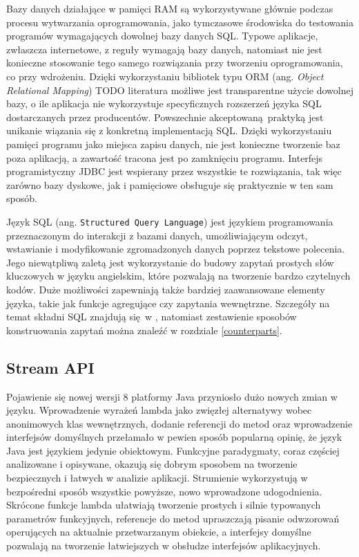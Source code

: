 \documentclass[12pt,twoside,openright]{extarticle}
\begin{document}
      Bazy danych działające w pamięci RAM są wykorzystywane głównie podczas procesu wytwarzania oprogramowania, jako tymczasowe środowiska do testowania programów wymagających dowolnej bazy danych SQL. Typowe aplikacje, zwłaszcza internetowe, z reguły wymagają bazy danych, natomiast nie jest konieczne stosowanie tego samego rozwiązania przy tworzeniu oprogramowania, co przy wdrożeniu. Dzięki wykorzystaniu bibliotek typu ORM (ang. \textit{Object Relational Mapping}) TODO literatura możliwe jest transparentne użycie dowolnej bazy, o ile aplikacja nie wykorzystuje specyficznych rozszerzeń języka SQL dostarczanych przez producentów. Powszechnie akceptowaną praktyką jest unikanie wiązania się z konkretną implementacją SQL. Dzięki wykorzystaniu pamięci programu jako miejsca zapisu danych, nie jest konieczne tworzenie baz poza aplikacją, a zawartość tracona jest po zamknięciu programu. Interfejs programistyczny JDBC jest wspierany przez wszystkie te rozwiązania, tak więc zarówno bazy dyskowe, jak i pamięciowe obsługuje się praktycznie w ten sam sposób. 

      Język SQL (ang. \texttt{Structured Query Language}) jest językiem programowania przeznaczonym do interakcji z bazami danych, umożliwiającym odczyt, wstawianie i modyfikowanie zgromadzonych danych poprzez tekstowe polecenia. Jego niewątpliwą zaletą jest wykorzystanie do budowy zapytań prostych słów kluczowych w języku angielskim, które pozwalają na tworzenie bardzo czytelnych kodów. Duże możliwości zapewniają także bardziej zaawansowane elementy języka, takie jak funkcje agregujące czy zapytania wewnętrzne. Szczegóły na temat składni SQL znajdują się w \cite{ullman}, natomiast zestawienie sposobów konstruowania zapytań można znaleźć w rozdziale \ref{counterparts}.


\subsection{Stream API}

    Pojawienie się nowej wersji 8 platformy Java przyniosło dużo nowych zmian w języku. Wprowadzenie wyrażeń lambda jako zwięzłej alternatywy wobec anonimowych klas wewnętrznych, dodanie referencji do metod oraz wprowadzenie interfejsów domyślnych przełamało w pewien sposób popularną opinię, że język Java jest językiem jedynie obiektowym. Funkcyjne paradygmaty, coraz częściej analizowane i opisywane, okazują się dobrym sposobem na tworzenie bezpiecznych i łatwych w analizie aplikacji. Strumienie wykorzystują w bezpośredni sposób wszystkie powyższe, nowo wprowadzone udogodnienia. Skrócone funkcje lambda ułatwiają tworzenie prostych i silnie typowanych parametrów funkcyjnych, referencje do metod upraszczają pisanie odwzorowań operujących na aktualnie przetwarzanym obiekcie, a interfejsy domyślne pozwalają na tworzenie łatwiejszych w obsłudze interfejsów aplikacyjnych.
\end{document}
